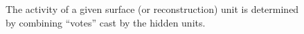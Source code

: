\begin{figure}[htb]
\begin{center}
\begin{tikzpicture}[shorten >=1pt,->,draw=black!100]
		
\end{tikzpicture}
\end{center}
\caption{%
The activity of a given surface (or reconstruction) unit is determined by combining ``votes'' cast by the hidden units.}
\label{fig:voting}
\end{figure}





